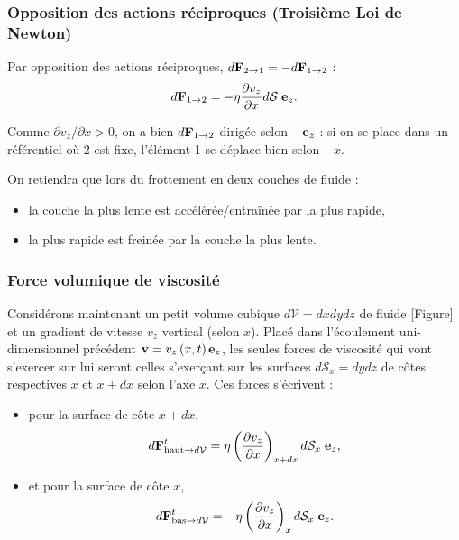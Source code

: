 \documentclass[11pt,a4paper]{report}
\begin{document}
\subsubsection{Opposition des actions réciproques (Troisième Loi de Newton)} 

Par opposition des actions réciproques, $d\bold{F}_{2\rightarrow 1} = - d\bold{F}_{1\rightarrow 2}$ :
\begin{equation}
	d\bold{F}_{1\rightarrow 2} = - \eta \frac{\partial v_z}{\partial x} d\mathcal{S}\;\bold{e}_z.
\end{equation}

Comme $\partial v_z/\partial x > 0$, on a bien $d\bold{F}_{1\rightarrow 2}$ dirigée selon $-\bold{e}_z$ : si on se place dans un référentiel où 2 est fixe, l'élément 1 se déplace bien selon $-x$.

On retiendra que lors du frottement en deux couches de fluide : 
\begin{itemize}
	\item la couche la plus lente est accélérée/entraînée par la plus rapide, 
	\item la plus rapide est freinée par la couche la plus lente.
\end{itemize}


\subsubsection{Force volumique de viscosité}

Considérons maintenant un petit volume cubique $d\mathcal{V} = dxdydz$ de fluide [Figure] et un gradient de vitesse $v_z$ vertical (selon $x$).
Placé dans l'écoulement uni-dimensionnel précédent $\bold{v} = v_z\left(x,t\right)\bold{e}_z$, les seules forces de viscosité qui vont s'exercer sur lui seront celles s'exerçant sur les surfaces $d\mathcal{S}_x = dy dz$ de côtes respectives $x$ et $x+dx$ selon l'axe $x$. Ces forces s'écrivent :
\begin{itemize}
	\item pour la surface de côte $x+dx$,
	\begin{equation}
		d\bold{F}_{\text{haut}\rightarrow d\mathcal{V}}^t =  \eta \left(\frac{\partial v_z}{\partial x}\right)_{x+dx} d\mathcal{S}_x\;\bold{e}_z,
	\end{equation}
	\item et pour la surface de côte $x$,
	\begin{equation}
		d\bold{F}_{\text{bas}\rightarrow d\mathcal{V}}^t = - \eta \left(\frac{\partial v_z}{\partial x}\right)_{x}    d\mathcal{S}_x\;\bold{e}_z.
	\end{equation}
\end{itemize}
\end{document}
